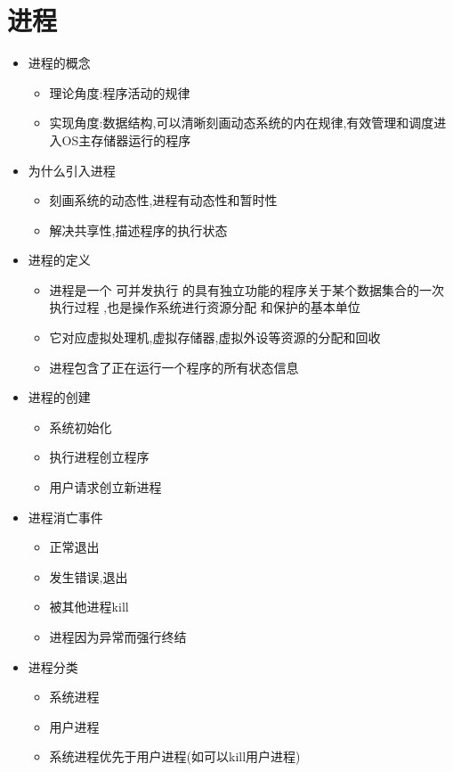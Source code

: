 \documentclass[a4paper,12pt,notitlepage]{article}
\begin{document}
\section{进程}
\begin{itemize}
	\item 进程的概念
	\begin{itemize}
		\item 理论角度:程序活动的规律
		\item 实现角度:数据结构,可以清晰刻画动态系统的内在规律,有效管理和调度进入OS主存储器运行的程序
	\end{itemize}
	\item 为什么引入进程
	\begin{itemize}
		\item 刻画系统的动态性,进程有动态性和暂时性
		\item 解决共享性,描述程序的执行状态
	\end{itemize}
	\item 进程的定义
	\begin{itemize}
		\item 进程是一个 可并发执行 的具有独立功能的程序关于某个数据集合的一次执行过程 ,也是操作系统进行资源分配 和保护的基本单位
		\item 它对应虚拟处理机,虚拟存储器,虚拟外设等资源的分配和回收
		\item 进程包含了正在运行一个程序的所有状态信息
	\end{itemize}
	\item 进程的创建
	\begin{itemize}
		\item 系统初始化
		\item 执行进程创立程序
		\item 用户请求创立新进程
	\end{itemize}
	\item 进程消亡事件
	\begin{itemize}
		\item 正常退出
		\item 发生错误,退出
		\item 被其他进程kill
		\item 进程因为异常而强行终结
	\end{itemize}
	\item 进程分类
	\begin{itemize}
		\item 系统进程
		\item 用户进程
		\item 系统进程优先于用户进程(如可以kill用户进程)
	\end{itemize}

\end{itemize}
\end{document}
